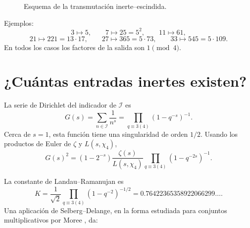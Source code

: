 \documentclass[11pt,a4paper,openany]{report}
\newcommand{\Iset}{\mathcal{I}}
\newcommand{\Sset}{\mathcal{S}}
\begin{document}
\begin{figure}[H]
\centering
{}
\caption{Esquema de la transmutación inerte--escindida.}
\label{fig:transmutation}
\end{figure}

Ejemplos:
\[
 3\mapsto5,
 \qquad
 7\mapsto25=5^2,
 \qquad
 11\mapsto61,
\]
\[
 21\mapsto221=13\cdot17,
 \qquad
 27\mapsto365=5\cdot73,
 \qquad
 33\mapsto545=5\cdot109.
\]
En todos los casos los factores de la salida son \(1\pmod4\).

\section{¿Cuántas entradas inertes existen?}

La serie de Dirichlet del indicador de \(\Iset\) es
\begin{equation}
 G(s)=\sum_{n\in\Iset}\frac1{n^s}
 =\prod_{q\equiv3(4)}(1-q^{-s})^{-1}.
 \label{eq:Ginert}
\end{equation}
Cerca de \(s=1\), esta función tiene una singularidad de orden \(1/2\). Usando los productos de Euler de \(\zeta\) y \(L(s,\chi_4)\),
\begin{equation}
 G(s)^2
 =(1-2^{-s})\frac{\zeta(s)}{L(s,\chi_4)}
 \prod_{q\equiv3(4)}(1-q^{-2s})^{-1}.
 \label{eq:G-square}
\end{equation}

La constante de Landau--Ramanujan es
\begin{equation}
 K=\frac1{\sqrt2}
 \prod_{q\equiv3(4)}(1-q^{-2})^{-1/2}
 =0.76422365358922066299\ldots.
 \label{eq:K}
\end{equation}
Una aplicación de Selberg--Delange, en la forma estudiada para conjuntos multiplicativos por Moree \cite{Moree}, da:
\end{document}
